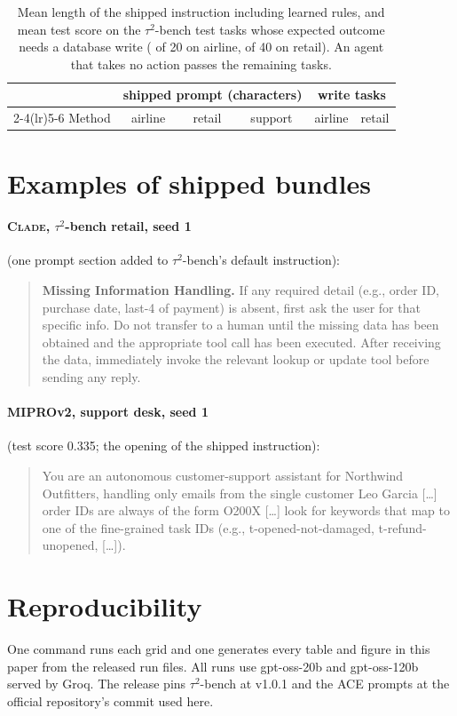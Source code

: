 \documentclass[11pt]{article}
\newcommand{\clade}{\textsc{Clade}\xspace}
\newcommand{\taub}{$\tau^2$-bench\xspace}
\begin{document}
\begin{table}[H]
\centering
\scriptsize
\setlength{\tabcolsep}{2.5pt}
\begin{tabular}{lccccc}
\toprule
& \multicolumn{3}{c}{shipped prompt (characters)} & \multicolumn{2}{c}{write tasks} \\
\cmidrule(lr){2-4}\cmidrule(lr){5-6}
Method & airline & retail & support & airline & retail \\
\midrule

\end{tabular}
\caption{Mean length of the shipped instruction including learned rules, and mean test score on the \taub test tasks
whose expected outcome needs a database write (\nWriteAir{} of 20 on airline, \nWriteRet{} of 40 on retail). An agent
that takes no action passes the remaining tasks.}
\label{tab:size}
\end{table}

\section{Examples of shipped bundles}
\label{app:examples}

\paragraph{\clade, \taub retail, seed 1} (one prompt section added to \taub's default instruction):
\begin{quote}\small
\textbf{Missing Information Handling.} If any required detail (e.g., order ID, purchase date, last-4 of payment) is
absent, first ask the user for that specific info. Do not transfer to a human until the missing data has been
obtained and the appropriate tool call has been executed. After receiving the data, immediately invoke the relevant
lookup or update tool before sending any reply.
\end{quote}

\paragraph{MIPROv2, support desk, seed 1} (test score 0.335; the opening of the shipped instruction):
\begin{quote}\small
You are an autonomous customer-support assistant for Northwind Outfitters, handling only emails from the single
customer Leo Garcia [\ldots] order IDs are always of the form O200X [\ldots] look for keywords that map to one of the
fine-grained task IDs (e.g., t-opened-not-damaged, t-refund-unopened, [\ldots]).
\end{quote}

\section{Reproducibility}

One command runs each grid and one generates every table and figure in this paper from the released run files.
All runs use gpt-oss-20b and gpt-oss-120b served by Groq. The release pins \taub at v1.0.1 and the ACE prompts at
the official repository's commit used here.
\end{document}

